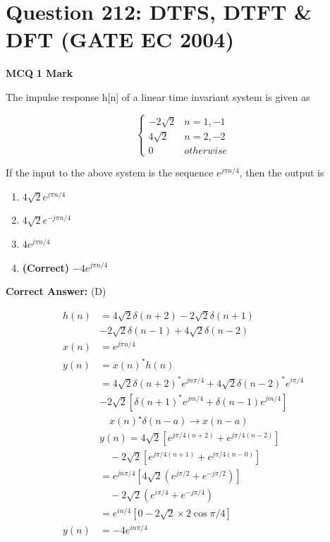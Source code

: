 \documentclass[11pt,a4paper]{article}
\begin{document}
\section*{Question 212: DTFS, DTFT \& DFT (GATE EC 2004)}
\noindent \textbf{\color{primary}MCQ} \hfill \textbf{\color{secondary}1 Mark}


\noindent The impulse response h[n] of a linear time invariant system is given as 

\[
\left\{\begin{matrix} -2\sqrt{2} & n=1,-1\\ 4\sqrt{2} & n=2,-2\\ 0& otherwise \end{matrix}\right.
\]
 
If the input to the above system is the sequence $e^{j\pi n/4}$, then the output is


\begin{enumerate}[label=(\Alph*)]
    \item $4\sqrt{2}e^{j\pi n/4}$
    \item $4\sqrt{2}e^{-j\pi n/4}$
    \item $4e^{j\pi n/4}$
    \item \textbf{(Correct)} $-4e^{j\pi n/4}$
\end{enumerate}

\noindent \textbf{Correct Answer:} (D)

\begin{tcolorbox}[solbox, title=Detailed Solution -- Question 212]
\[
\begin{aligned} h(n)&= 4 \sqrt{2} \delta(n+2)-2 \sqrt{2} \delta(n+1) \\ &-2 \sqrt{2} \delta(n-1)+4 \sqrt{2} \delta(n-2) \\ x(n)&=e^{j \pi n / 4} \\ y(n)&= x(n)^{*} h(n) \\ &=4 \sqrt{2} \delta(n+2)^{*} e^{j n \pi / 4}+4 \sqrt{2} \delta(n-2)^{*} e^{i \pi / 4} \\ &-2 \sqrt{2}\left[\delta(n+1)^{*} e^{j m / 4}+\delta(n-1) e^{j m / 4}\right] \\ &\quad x(n)^{\star} \delta(n-a) \rightarrow x(n-a) \\ &y(n)=4 \sqrt{2}\left[e^{j \pi / 4(n+2)}+e^{j \pi / 4(n-2)}\right] \\ &\quad -2 \sqrt{2}\left[e^{j \pi / 4(n+1)}+e^{j \pi / 4(n-0)}\right] \\ &=e^{j n \pi / 4}\left[4 \sqrt{2}\left(e^{j \pi / 2}+e^{-j \pi / 2}\right)\right] \\ &\quad -2 \sqrt{2}\left(e^{i \pi / 4}+e^{-j \pi / 4}\right) \\ &=e^{i n / 4}[0-2 \sqrt{2} \times 2 \cos \pi / 4] \\ y(n)&=-4 e^{i n \pi / 4} \end{aligned}
\]
\end{tcolorbox}
\end{document}
